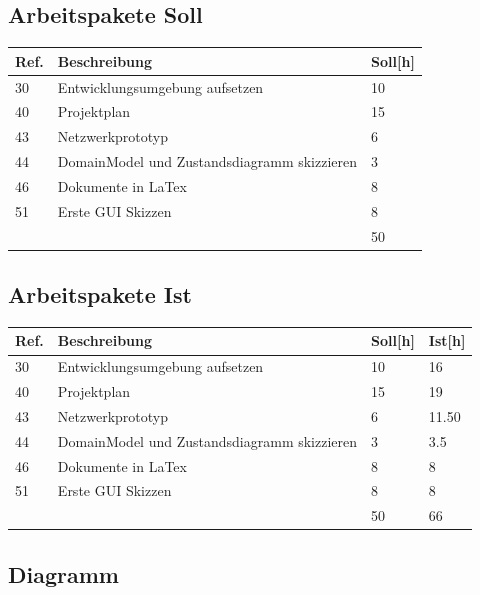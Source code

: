 \documentclass[11pt]{scrartcl}
\begin{document}
\subsection{Arbeitspakete Soll}
  \begin{tabularx} {\linewidth}{lXl}
    \bf{Ref.}  & \bf{Beschreibung} & \bf{Soll[h]} \\
    \hline
    30 & Entwicklungsumgebung aufsetzen & 10 \\
    40 & Projektplan & 15 \\
    43 & Netzwerkprototyp & 6 \\
    44 & DomainModel und Zustandsdiagramm skizzieren & 3 \\
    46 & Dokumente in LaTex & 8 \\
    51 & Erste GUI Skizzen & 8 \\
    \hline
    & & 50
  \end{tabularx}
  
  \subsection{Arbeitspakete Ist}
  \begin{tabularx} {\linewidth}{lXll}
    \bf{Ref.}  & \bf{Beschreibung} & \bf{Soll[h]}  & \bf{Ist[h]}\\
    \hline
    30 & Entwicklungsumgebung aufsetzen & 10 & 16 \\
    40 & Projektplan & 15 & 19\\
    43 & Netzwerkprototyp & 6 & 11.50\\
    44 & DomainModel und Zustandsdiagramm skizzieren & 3 & 3.5 \\
    46 & Dokumente in LaTex & 8 & 8\\
    51 & Erste GUI Skizzen & 8 & 8\\
    \hline
    & & 50 & 66
    \end{tabularx}
    
    
    \subsection{Diagramm}
    
\end{document}
